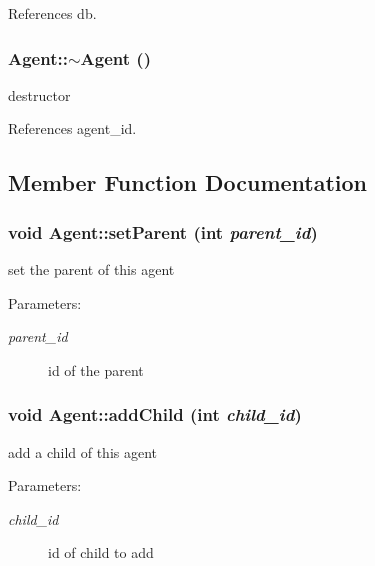 References db.
\subsubsection[$\sim$Agent]{\setlength{\rightskip}{0pt plus 5cm}Agent::$\sim$Agent ()}\label{classHive_1_1Agent_b8dd8d152605cf1339fed595376e83cb}


destructor 



References agent\_\-id.

\subsection{Member Function Documentation}
\subsubsection[setParent]{\setlength{\rightskip}{0pt plus 5cm}void Agent::setParent (int {\em parent\_\-id})}\label{classHive_1_1Agent_a6731cfdbcd8fd882e3f49a93c73dad8}


set the parent of this agent \begin{Desc}
\item[Parameters:]
\begin{description}
\item[{\em parent\_\-id}]id of the parent \end{description}
\end{Desc}
\subsubsection[addChild]{\setlength{\rightskip}{0pt plus 5cm}void Agent::addChild (int {\em child\_\-id})}\label{classHive_1_1Agent_9635010b401c5249d974a8a071d49261}


add a child of this agent \begin{Desc}
\item[Parameters:]
\begin{description}
\item[{\em child\_\-id}]id of child to add \end{description}
\end{Desc}


